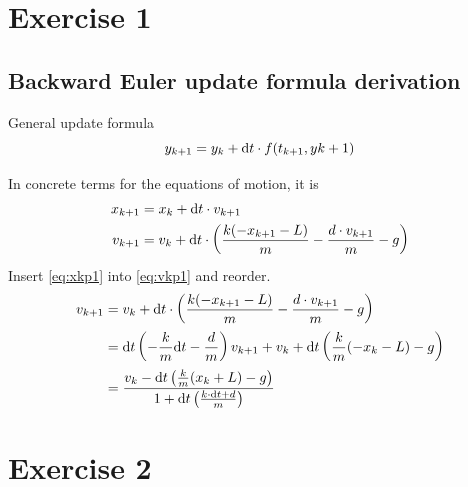 \section*{Exercise 1}
\subsection*{Backward Euler update formula derivation}
General update formula
\begin{equation}
 y_{k+1} = y_k + \mathrm d t \cdot f(t_{k+1}, y{k+1})
\end{equation}

In concrete terms for the equations of motion, it is
\begin{subequations}
 \begin{align}
  x_{k+1} &= x_k + \mathrm d t \cdot v_{k+1}
  \label{eq:xkp1}\\
  v_{k+1} &= v_k + \mathrm d t \cdot \left( \frac{k(-x_{k+1} -L)}{m} - \frac{d\cdot v_{k+1}}{m} -g \right)
  \label{eq:vkp1}
 \end{align}
\end{subequations}
Insert \eqref{eq:xkp1} into \eqref{eq:vkp1} and reorder.
\begin{subequations}
 \begin{align}
  v_{k+1} &= v_k + \mathrm d t \cdot \left( \frac{k(-x_{k+1} -L)}{m} - \frac{d\cdot v_{k+1}}{m} -g \right)\\
          &= \mathrm d t\left(-\frac{k}{m}\mathrm d t - \frac{d}{m}\right) v_{k+1} + v_k + \mathrm d t\left( \frac{k}{m}(-x_k-L)-g \right)\\
          &= \frac{ v_k -\mathrm d t \left(\frac{k}{m} (x_k + L) -g \right)}{1+\mathrm d t \left( \frac{k\cdot \mathrm d t + d}{m} \right)}
 \end{align}
\end{subequations}
\section*{Exercise 2}
